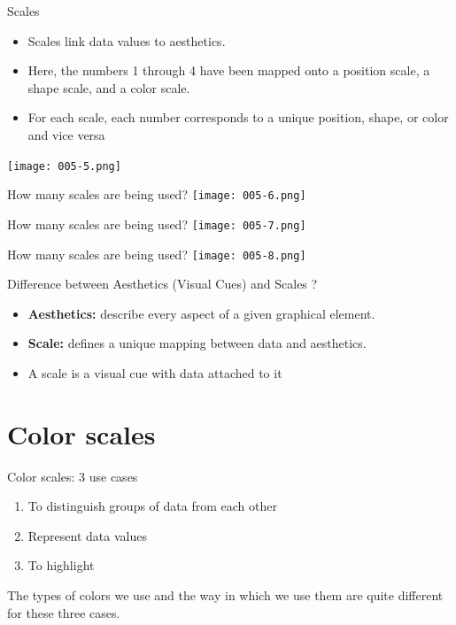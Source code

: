 \documentclass[10pt,handout]{beamer}\usepackage[]{graphicx}\usepackage[]{color}
\begin{document}
	\begin{frame}{Scales}
		\begin{itemize}
			\item Scales link data values to aesthetics. 
			\item Here, the numbers 1 through 4 have been mapped onto a position scale, a shape scale, and a color scale. 
			\item For each scale, each number corresponds to a unique position, shape, or color and vice versa
		\end{itemize}
	\centering
	\texttt{[image: 005-5.png]}
\end{frame}


	\begin{frame}{How many scales are being used?}
	\centering
	\texttt{[image: 005-6.png]}
\end{frame}

	\begin{frame}{How many scales are being used?}
	\centering
	\texttt{[image: 005-7.png]}
\end{frame}

	\begin{frame}{How many scales are being used?}
	\centering
	\texttt{[image: 005-8.png]}
\end{frame}


\begin{frame}{Difference between Aesthetics (Visual Cues) and Scales ?}
\begin{itemize}
	\item \textbf{Aesthetics:} describe every aspect of a given graphical element.
	\item \textbf{Scale:} defines a unique mapping between data and aesthetics.
	\item A scale is a visual cue with data attached to it
	
\end{itemize}
\end{frame}


\section{Color scales}

\begin{frame}{Color scales: 3 use cases}
	\begin{enumerate}
		\item To distinguish groups of data from each other
		\item Represent data values
		\item To highlight
	\end{enumerate}

\vspace{0.2in}
		The types of colors we use and the way in which we use them are quite different for these three cases.
\end{frame}
\end{document}
